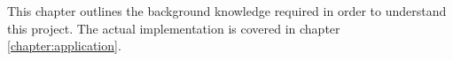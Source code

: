 This chapter outlines the background knowledge required in order to understand this project. The actual implementation is covered in chapter \ref{chapter:application}.






